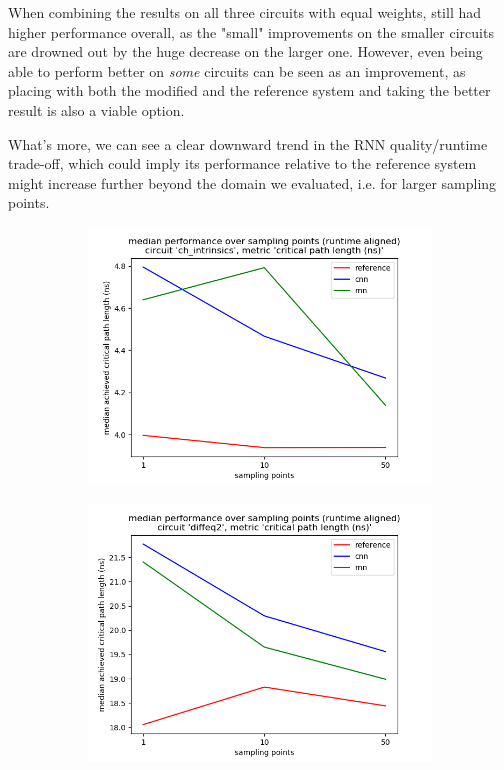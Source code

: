 When combining the results on all three circuits with equal weights, still had higher performance overall, as the "small" improvements on the smaller circuits are drowned out by the huge decrease on the larger one. However, even being able to perform better on \textit{some} circuits can be seen as an improvement, as placing with both the modified and the reference system and taking the better result is also a viable option.

What's more, we can see a clear downward trend in the \gls{RNN} quality/runtime trade-off, which could imply its performance relative to the reference system might increase further beyond the domain we evaluated, i.e. for larger sampling points.

\begin{figure}
	\centering
	\begin{subfigure}[b]{0.45\linewidth}
		\includegraphics[width=\linewidth]{plots/eval-ch_intrinsics-critical-path-median.png}
	\end{subfigure}
	\begin{subfigure}[b]{0.45\linewidth}
		\includegraphics[width=\linewidth]{plots/eval-diffeq2-critical-path-median.png}

\end{subfigure}
\end{figure}
